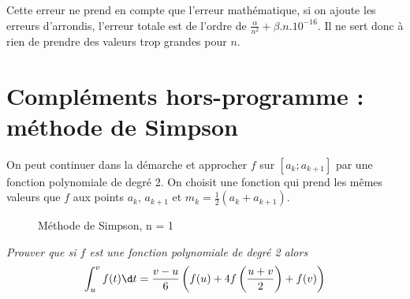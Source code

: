 Cette erreur ne prend en compte que l'erreur mathématique, si on ajoute les erreurs d'arrondis, l'erreur totale est de l'ordre de $\frac \alpha{n^2} + \beta.n.10^{-16}$. Il ne sert donc à rien de prendre des valeurs trop grandes pour $n$.
\newpage
\section{Compléments hors-programme : méthode de Simpson}
On peut continuer dans la démarche et approcher $f$ sur $[a_k; a_{k+1}]$ par une fonction polynomiale de degré 2. On choisit une fonction qui prend les mêmes valeurs que $f$ aux points $a_k$, $a_{k+1}$ et $m_k=\frac 12(a_k+a_{k+1})$.
\begin{figure}[ht]
\begin{center}
\end{center}
  \caption{ Méthode de Simpson, n = 1}
  \label{fig:trap}
\end{figure}
\begin{Exercise}\it
Prouver que si $f$ est une fonction polynomiale de degré 2 alors 
\[ \int_u^v f(t) \d t = \frac {v - u}6 \left(f(u) + 4 f\left(\frac{u+v}2\right) + f(v)\right)\]
\end{Exercise}
